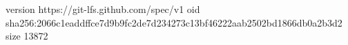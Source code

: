 version https://git-lfs.github.com/spec/v1
oid sha256:2066c1eaddffce7d9b9fc2de7d234273c13bf46222aab2502bd1866db0a2b3d2
size 13872
